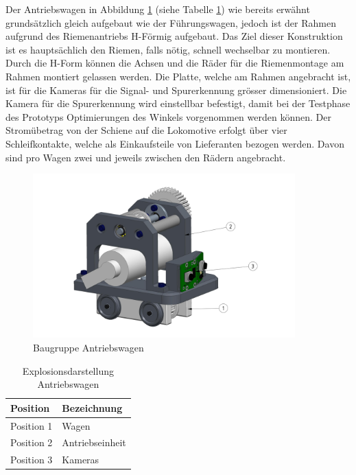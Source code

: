 \documentclass[../../main.tex]{subfiles}
\begin{document}
    Der Antriebswagen in Abbildung \ref{fig:antriebswagen} (siehe Tabelle \ref{tab:expl_antriebswagen}) wie bereits erwähnt grundsätzlich gleich aufgebaut wie der Führungswagen, jedoch ist der Rahmen aufgrund des Riemenantriebs H-Förmig aufgebaut. Das Ziel dieser Konstruktion ist es hauptsächlich den Riemen, falls nötig, schnell wechselbar zu montieren. Durch die H-Form können die Achsen und die Räder für die Riemenmontage am Rahmen montiert gelassen werden. Die Platte, welche am Rahmen angebracht ist, ist für die Kameras für die Signal- und Spurerkennung grösser dimensioniert. Die Kamera für die Spurerkennung wird einstellbar befestigt, damit bei der Testphase des Prototyps Optimierungen des Winkels vorgenommen werden können. Der Stromübetrag von der Schiene auf die Lokomotive erfolgt über vier Schleifkontakte, welche als Einkaufsteile von Lieferanten bezogen werden. Davon sind pro Wagen zwei und jeweils zwischen den Rädern angebracht.\\

    \begin{figure}[H] %
        \centering
        \includegraphics[width=0.9\textwidth]{antriebswagen.png}
        \caption{Baugruppe Antriebswagen}
        \label{fig:antriebswagen}
    \end{figure} 

    \begin{table}[H] \centering
        \begin{tabular}{|l|l|}
        \hline
        \textbf{Position} & \textbf{Bezeichnung}\\
        \hline
        Position 1          & Wagen\\
         \hline
        Position 2          & Antriebseinheit\\
        \hline
        Position 3          & Kameras\\
        \hline
    \end{tabular}
    
    \caption{Explosionsdarstellung Antriebswagen}
    \label{tab:expl_antriebswagen}
    \end{table}
\end{document}
